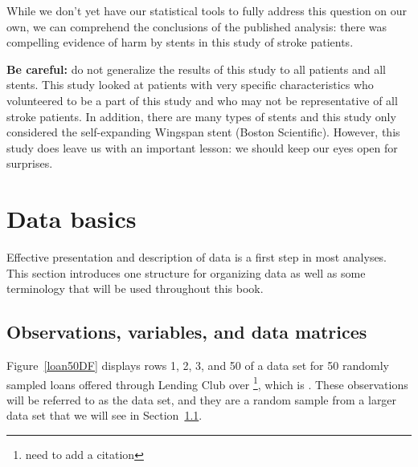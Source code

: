 While we don't yet have our statistical tools to fully address this question on our own, we can comprehend the conclusions of the published analysis: there was compelling evidence of harm by stents in this study of stroke patients.

\textbf{Be careful:} do not generalize the results of this study to all patients and all stents. This study looked at patients with very specific characteristics who volunteered to be a part of this study and who may not be representative of all stroke patients. In addition, there are many types of stents and this study only considered the self-expanding Wingspan stent (Boston Scientific). However, this study does leave us with an important lesson: we should keep our eyes open for surprises.


\section{Data basics}
\label{dataBasics}

Effective presentation and description of data is a first step in most analyses. This section introduces one structure for organizing data as well as some terminology that will be used throughout this book.

\subsection{Observations, variables, and data matrices}



Figure~\ref{loan50DF} displays rows 1, 2, 3, and 50 of a data set
for 50 randomly sampled loans offered through Lending
Club over \footnote{need
to add a citation},
which is .
These observations will be referred to as the  data set, and they are a random sample from a larger data set that we will see in Section~\ref{}.


